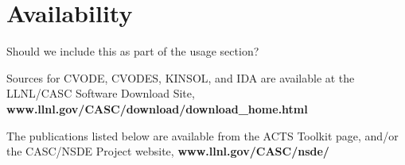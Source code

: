 \section{Availability}
{\sf Should we include this as part of the usage section?}


Sources for CVODE, CVODES, KINSOL, and IDA are available at the
LLNL/CASC Software Download Site,
\newline \hspace*{.5in} {\bf www.llnl.gov/CASC/download/download\_home.html}

The publications listed below are available from the ACTS Toolkit page,
and/or the CASC/NSDE Project website,
\newline \hspace*{.5in} {\bf www.llnl.gov/CASC/nsde/}



